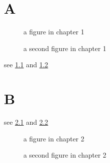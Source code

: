 \documentclass{book}
\begin{document}
\chapter{A}

\begin{figure}
\caption{a figure in chapter 1}\label{fig:1}
\end{figure}

\begin{figure}
\caption{a second figure in chapter 1}\label{fig:12}
\end{figure}

see \ref{fig:1} and \ref{fig:12}

\chapter{B}

see \ref{fig:21} and \ref{fig:2}


\begin{figure}
\caption{a figure in chapter 2}\label{fig:21}
\end{figure}

\begin{figure}
\caption{a second figure in chapter 2}\label{fig:2}
\end{figure}
\end{document}
